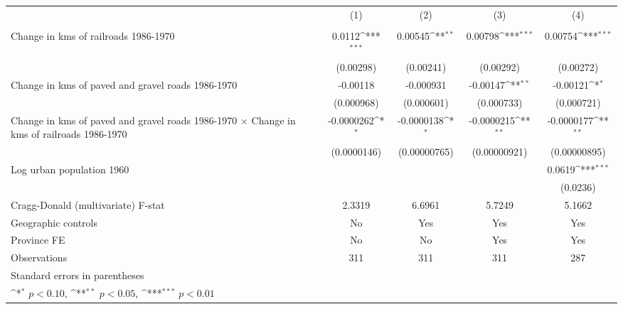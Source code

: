 {
\def\sym#1{\ifmmode^{#1}\else\(^{#1}\)\fi}
\begin{tabular}{l*{4}{c}}
\hline\hline
                &\multicolumn{1}{c}{(1)}&\multicolumn{1}{c}{(2)}&\multicolumn{1}{c}{(3)}&\multicolumn{1}{c}{(4)}\\
                &\multicolumn{1}{c}{}&\multicolumn{1}{c}{}&\multicolumn{1}{c}{}&\multicolumn{1}{c}{}\\
\hline
Change in kms of railroads 1986-1970&   0.0112\sym{***}&  0.00545\sym{**} &  0.00798\sym{***}&  0.00754\sym{***}\\
                &(0.00298)         &(0.00241)         &(0.00292)         &(0.00272)         \\
[1em]
Change in kms of paved and gravel roads 1986-1970& -0.00118         &-0.000931         & -0.00147\sym{**} & -0.00121\sym{*}  \\
                &(0.000968)         &(0.000601)         &(0.000733)         &(0.000721)         \\
[1em]
Change in kms of paved and gravel roads 1986-1970 $\times$ Change in kms of railroads 1986-1970&-0.0000262\sym{*}  &-0.0000138\sym{*}  &-0.0000215\sym{**} &-0.0000177\sym{**} \\
                &(0.0000146)         &(0.00000765)         &(0.00000921)         &(0.00000895)         \\
[1em]
Log urban population 1960&                  &                  &                  &   0.0619\sym{***}\\
                &                  &                  &                  & (0.0236)         \\
\hline
Cragg-Donald (multivariate) F-stat&   2.3319         &   6.6961         &   5.7249         &   5.1662         \\
Geographic controls&       No         &      Yes         &      Yes         &      Yes         \\
Province FE     &       No         &       No         &      Yes         &      Yes         \\
Observations    &      311         &      311         &      311         &      287         \\
\hline\hline
\multicolumn{5}{l}{\footnotesize Standard errors in parentheses}\\
\multicolumn{5}{l}{\footnotesize \sym{*} \(p<0.10\), \sym{**} \(p<0.05\), \sym{***} \(p<0.01\)}\\
\end{tabular}
}
